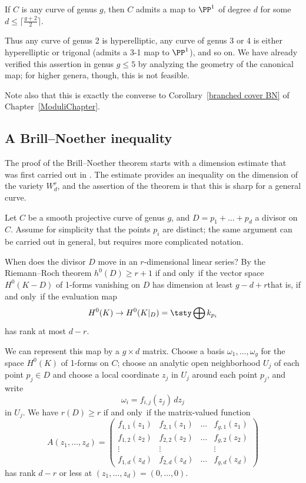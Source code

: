 \begin{corollary}\label{gonality bound}
If $C$ is any curve of genus $g$, then $C$ admits a map  to $\PP^1$
of degree $d$ for some $d \leq \bigl\lceil \frac{g+2}{2}\bigr\rceil$.
\end{corollary}

Thus any curve of genus 2 is hyperelliptic, any curve of genus 3 or
4 is either hyperelliptic or trigonal  (admits a 3-1 map to $\PP^1$),
and so on. We have already verified this assertion in genus $g \leq 5$
by analyzing the geometry of the canonical map; for higher genera,
though, this is not feasible.

Note also that this is exactly the converse to Corollary~\ref{branched
cover BN} of Chapter~\ref{ModuliChapter}.


\subsection{A Brill--Noether inequality}\label{BN by divisors}

The proof of the Brill--Noether theorem starts with a dimension
estimate that was first carried out in
\cite{Brill-NoetherOriginal}. The estimate provides an inequality on
the dimension of the variety $W^r_d$, and the assertion of the theorem
is that this is sharp for a general curve.


Let $C$ be a smooth projective curve of genus $g$, and $D = p_1 + \dots
+ p_d$ a divisor on $C$. Assume for simplicity that  the points $p_i$
are distinct; the same argument  can be carried out in general, but
requires more complicated notation.

When does the divisor $D$ move in an $r$-dimensional linear series? By
the
Riemann--Roch theorem
%
$h^0(D) \geq r+1$ if and only~if the vector
space $H^0(K-D)$ of 1-forms vanishing on $D$ has dimension at least
$g-d+r$\emdash that is, if and only~if the  evaluation map
$$
H^0(K) \to H^0(K|_D) = \tsty\bigoplus k_{p_i}
$$
has rank at most $d-r$.

We can represent this map by a $g \times d$ matrix. Choose a basis
$\omega_1,\dots,\omega_g$ for the space $H^0(K)$ of 1-forms on $C$;
choose an analytic open neighborhood $U_j$ of each point $p_j \in D$
and choose a local coordinate $z_j$ in $U_j$ around each point $p_j$,
and write
$$
\omega_i = f_{i,j}(z_j)\,dz_j
$$
in $U_j$. We  have $r(D) \geq r$ if and only~if the  matrix-valued
function
$$
A(z_1,\dots,z_d) =
\begin{pmatrix}
f_{1,1}(z_1) & f_{2,1}(z_1) & \dots & f_{g,1}(z_1) \\
f_{1,2}(z_2) & f_{2,2}(z_2) & \dots & f_{g,2}(z_2) \\
\vdots & \vdots &  & \vdots \\
f_{1,d}(z_d) & f_{2,d}(z_d) & \dots & f_{g,d} (z_d)
\end{pmatrix}
$$
has rank $d-r$ or less at $(z_1,\dots,z_d) = (0,\dots,0)$.


